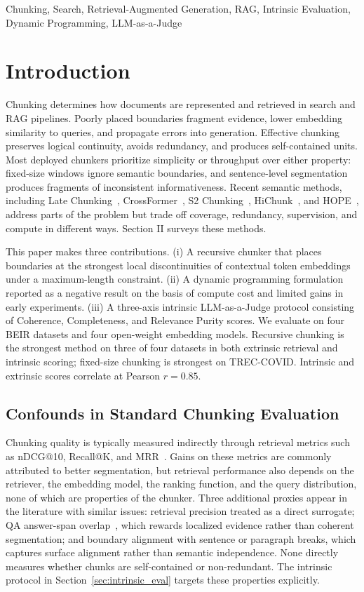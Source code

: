 \begin{IEEEkeywords}
Chunking, Search, Retrieval-Augmented Generation, RAG, Intrinsic Evaluation, Dynamic Programming, LLM-as-a-Judge
\end{IEEEkeywords}

\section{Introduction}
Chunking determines how documents are represented and retrieved in search and RAG pipelines. Poorly placed boundaries fragment evidence, lower embedding similarity to queries, and propagate errors into generation. Effective chunking preserves logical continuity, avoids redundancy, and produces self-contained units. Most deployed chunkers prioritize simplicity or throughput over either property: fixed-size windows ignore semantic boundaries, and sentence-level segmentation produces fragments of inconsistent informativeness. Recent semantic methods, including Late Chunking~\cite{gunther2024late}, CrossFormer~\cite{ni2025crossformer}, S2 Chunking~\cite{verma2025s2chunking}, HiChunk~\cite{lu2025hichunk}, and HOPE~\cite{bradland2025hope}, address parts of the problem but trade off coverage, redundancy, supervision, and compute in different ways. Section II surveys these methods.

This paper makes three contributions. (i) A recursive chunker that places boundaries at the strongest local discontinuities of contextual token embeddings under a maximum-length constraint. (ii) A dynamic programming formulation reported as a negative result on the basis of compute cost and limited gains in early experiments. (iii) A three-axis intrinsic LLM-as-a-Judge protocol consisting of Coherence, Completeness, and Relevance Purity scores. We evaluate on four BEIR datasets and four open-weight embedding models. Recursive chunking is the strongest method on three of four datasets in both extrinsic retrieval and intrinsic scoring; fixed-size chunking is strongest on TREC-COVID. Intrinsic and extrinsic scores correlate at Pearson $r=0.85$.

\subsection{Confounds in Standard Chunking Evaluation}
Chunking quality is typically measured indirectly through retrieval metrics such as nDCG@10, Recall@K, and MRR~\cite{thakur2021beir}. Gains on these metrics are commonly attributed to better segmentation, but retrieval performance also depends on the retriever, the embedding model, the ranking function, and the query distribution, none of which are properties of the chunker. Three additional proxies appear in the literature with similar issues: retrieval precision treated as a direct surrogate; QA answer-span overlap~\cite{wadden2020scifact}, which rewards localized evidence rather than coherent segmentation; and boundary alignment with sentence or paragraph breaks, which captures surface alignment rather than semantic independence. None directly measures whether chunks are self-contained or non-redundant. The intrinsic protocol in Section~\ref{sec:intrinsic_eval} targets these properties explicitly.

